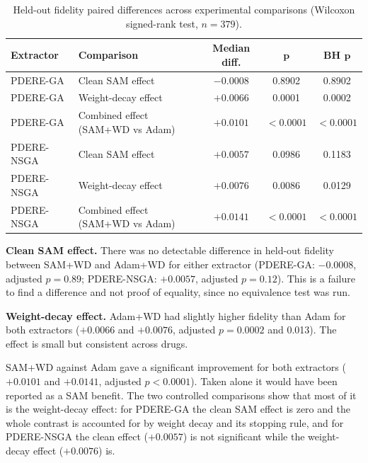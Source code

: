 \begin{table}[htbp]
  \centering
  \caption{Held-out fidelity paired differences across experimental comparisons (Wilcoxon signed-rank test, $n = 379$).}
  \label{tab:fidelity-diff}
  \small
  \renewcommand{\arraystretch}{1.2}
  \begin{tabularx}{\textwidth}{@{}l>{\raggedright\arraybackslash}Xccc@{}}
    \toprule
    \textbf{Extractor} & \textbf{Comparison} & \textbf{Median diff.} & $\boldsymbol{p}$ & \textbf{BH} $\boldsymbol{p}$ \\
    \midrule
    PDERE-GA   & Clean SAM effect                  & $-0.0008$ & 0.8902   & 0.8902 \\
    PDERE-GA   & Weight-decay effect               & $+0.0066$ & 0.0001   & 0.0002 \\
    PDERE-GA   & Combined effect (SAM+WD vs Adam)  & $+0.0101$ & $<0.0001$ & $<0.0001$ \\
    PDERE-NSGA & Clean SAM effect                  & $+0.0057$ & 0.0986   & 0.1183 \\
    PDERE-NSGA & Weight-decay effect               & $+0.0076$ & 0.0086   & 0.0129 \\
    PDERE-NSGA & Combined effect (SAM+WD vs Adam)  & $+0.0141$ & $<0.0001$ & $<0.0001$ \\
    \bottomrule
  \end{tabularx}
\end{table}

\textbf{Clean SAM effect.} There was no detectable difference in held-out fidelity between SAM+WD and Adam+WD for either extractor (PDERE-GA: $-0.0008$, adjusted $p = 0.89$; PDERE-NSGA: $+0.0057$, adjusted $p = 0.12$). This is a failure to find a difference and not proof of equality, since no equivalence test was run.

\textbf{Weight-decay effect.} Adam+WD had slightly higher fidelity than Adam for both extractors ($+0.0066$ and $+0.0076$, adjusted $p = 0.0002$ and 0.013). The effect is small but consistent across drugs.

SAM+WD against Adam gave a significant improvement for both extractors ($+0.0101$ and $+0.0141$, adjusted $p < 0.0001$). Taken alone it would have been reported as a SAM benefit. The two controlled comparisons show that most of it is the weight-decay effect: for PDERE-GA the clean SAM effect is zero and the whole contrast is accounted for by weight decay and its stopping rule, and for PDERE-NSGA the clean effect ($+0.0057$) is not significant while the weight-decay effect ($+0.0076$) is.

